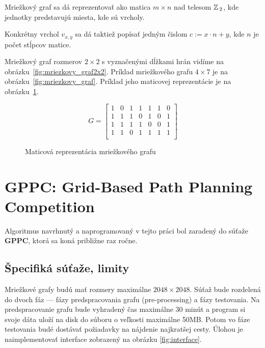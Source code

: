 \begin{note}
	Mriežkový graf sa dá reprezentovať ako matica $m \times n$ nad telesom $\mathbb{Z}\,_2$, kde jednotky predstavujú miesta, kde sú vrcholy. 
\end{note}

\begin{note}
\label{note:popis_vrcholu}
	Konkrétny vrchol $v_{x,y}$ sa dá taktiež popísať jedným čislom $c:= x\cdot n + y$, kde $n$ je počet stĺpcov matice.
\end{note}


\begin{example}
Mriežkový graf rozmerov $2 \times 2$ s vyznačenými dĺžkami
hrán vidíme na obrázku~\ref{fig:mriezkovy_graf2x2}.
Príklad mriežkového grafu $4 \times 7$ je na obrázku~\ref{fig:mriezkovy_graf}.
Príklad jeho maticovej reprezentácie je na obrázku~\ref{fig:maticova_reprezentacia}.

\end{example}


\begin{figure}[h]


\[
G =
  \begin{bmatrix}
    1 & 0 & 1 & 1 & 1 & 1 & 0\\
	1 & 1 & 1 & 0 & 1 & 0 & 1\\
	1 & 1 & 1 & 1 & 0 & 0 & 1\\
	1 & 1 & 0 & 1 & 1 & 1 & 1\\
  \end{bmatrix}
\]

\caption{Maticová reprezentácia mriežkového grafu}
\label{fig:maticova_reprezentacia}
\end{figure}




\section{GPPC: Grid-Based Path Planning Competition}
Algoritmus navrhnutý a naprogramovaný v tejto práci bol zaradený do súťaže \textbf{GPPC}, ktorá sa koná približne raz ročne.

\subsection{Špecifiká súťaže, limity}

Mriežkové grafy budú mať rozmery maximálne $2048 \times 2048$.
Súťaž bude rozdelená do dvoch fáz --- fázy predspracovania grafu (pre-processing)
a fázy testovania. Na predspracovanie grafu bude vyhradený čas
maximálne 30 minút a program si svoje dáta uloží na disk do súboru o veľkosti maximálne 50MB.
Potom vo fáze testovania budé dostávať požiadavky na nájdenie najkratšej cesty. Úlohou je naimplementovať interface zobrazený na obrázku \ref{fig:interface}. 

